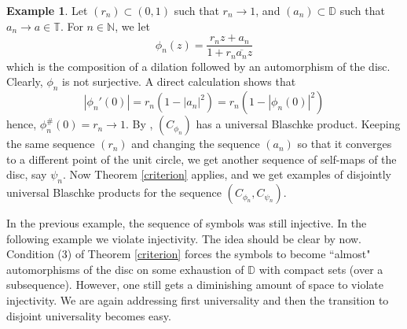 \documentclass[12pt,a4paper]{amsart}
\theoremstyle{plain}
\theoremstyle{definition}
\newtheorem{example}[theorem]{Example}
\theoremstyle{remark}
\theoremstyle{fact}
\begin{document}
    \begin{example}
      Let $(r_n)\subset (0,1)$ such that $r_n\rightarrow 1$, and $(a_n)\subset \mathbb{D}$ such that $a_n\rightarrow a\in \mathbb{T}$. For $n\in \mathbb{N}$, we let
      $$
      \phi_n(z)=\frac{r_nz+a_n}{1+r_n\overline{a_n}z}
      $$
      which is the composition of a dilation followed by an automorphism of the disc. Clearly, $\phi_n$ is not surjective. A direct calculation shows that
      $$
      |\phi_n'(0)|=r_n(1-|a_n|^2)=r_n(1-|\phi_n(0)|^2)
      $$
      hence, $\phi_n^\#(0)=r_n\rightarrow 1$. By \cite[Theorem 2.1]{BGGM09}, $(C_{\phi_n})$ has a universal Blaschke product. Keeping the same sequence $(r_n)$ and changing the sequence $(a_n)$ so that it converges to a different point of the unit circle, we get another sequence of self-maps of the disc, say $\psi_n$. Now Theorem \ref{criterion} applies, and we get examples of disjointly universal Blaschke products for the sequence $(C_{\phi_n},C_{\psi_n})$.
    \end{example}

    In the previous example, the sequence of symbols was still injective. In the following example we violate injectivity. The idea should be clear by now. Condition (3) of Theorem \ref{criterion} forces the symbols to become ``almost" automorphisms of the disc on some exhaustion of $\mathbb{D}$ with compact sets (over a subsequence). However, one still gets a diminishing amount of space to violate injectivity. We are again addressing first universality and then the transition to disjoint universality becomes easy.
\end{document}
